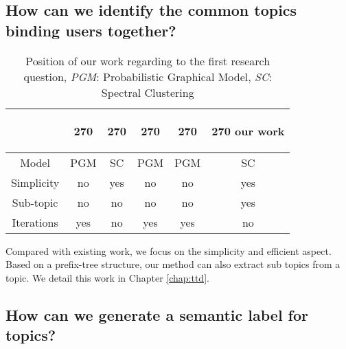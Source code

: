 \subsection{How can we identify the common topics binding users together?}
    
    \begin{table}[htp]
        \centering
        \begin{tabular}{c c c c c c}
        &
        \begin{turn}{270}
            \cite{blei2003latent} \end{turn} 
        &
        \begin{turn}{270} 
            \cite{Chang:2013} 
        \end{turn}
        &
        \begin{turn}{270} 
            \cite{yang2013cqarank}
        \end{turn}
        &
        \begin{turn}{270}
            \cite{hu2014user}
        \end{turn}
        &
        \begin{turn}{270}
        our work
        \end{turn}
        \\ \hline
        Model & PGM & SC & PGM & PGM & SC\\ \hline
        Simplicity & no & yes & no & no & yes\\ \hline
        Sub-topic & no & no & no & no &  yes \\ \hline
        Iterations & yes & no & yes& yes & no \\ \hline
        
        \end{tabular}
        \caption{Position of our work regarding to the first research question, \textit{PGM}: Probabilistic Graphical Model, \textit{SC}: Spectral Clustering}
        \label{tab:rq2compare}
    \end{table}
    
    Compared with existing work, we focus on the simplicity and efficient aspect. Based on a prefix-tree structure, our method can also extract sub topics from a topic. We detail this work in Chapter \ref{chap:ttd}.
    
    
    
\subsection{How can we generate a semantic label for topics?}



